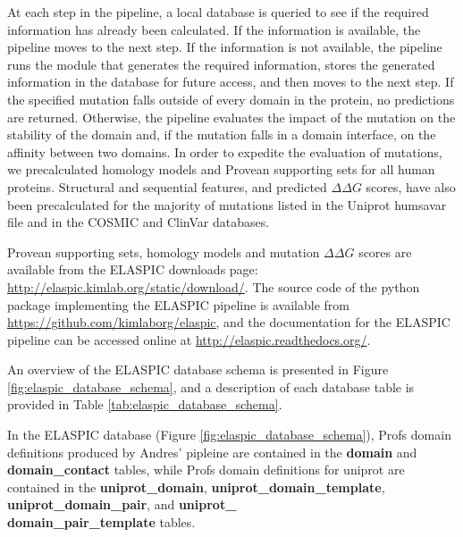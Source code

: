 At each step in the pipeline, a local database is queried to see if the required information has already been calculated. If the information is available, the pipeline moves to the next step. If the information is not available, the pipeline runs the module that generates the required information, stores the generated information in the database for future access, and then moves to the next step. If the specified mutation falls outside of every domain in the protein, no predictions are returned. Otherwise, the pipeline evaluates the impact of the mutation on the stability of the domain and, if the mutation falls in a domain interface, on the affinity between two domains. In order to expedite the evaluation of mutations, we precalculated homology models and Provean supporting sets for all human proteins. Structural and sequential features, and predicted $\Delta \Delta G$ scores, have also been precalculated for the majority of mutations listed in the Uniprot humsavar file \cite{consortium_uniprot:_2015} and in the COSMIC \cite{forbes_cosmic:_2015} and ClinVar \cite{landrum_clinvar:_2016} databases.

Provean supporting sets, homology models and mutation $\Delta \Delta G$ scores are available from the ELASPIC downloads page: \url{http://elaspic.kimlab.org/static/download/}. The source code of the python package implementing the ELASPIC pipeline is available from \url{https://github.com/kimlaborg/elaspic}, and the documentation for the ELASPIC pipeline can be accessed online at \url{http://elaspic.readthedocs.org/}.

An overview of the ELASPIC database schema is presented in Figure \ref{fig:elaspic_database_schema}, and a description of each database table is provided in Table \ref{tab:elaspic_database_schema}.

In the ELASPIC database (Figure \ref{fig:elaspic_database_schema}), Profs domain definitions produced by Andres' pipleine are contained in the \textbf{domain} and \textbf{domain\_contact} tables, while Profs domain definitions for uniprot are contained in the \textbf{uniprot\_domain}, \textbf{uniprot\_domain\_template}, \textbf{uniprot\_domain\_pair}, and \textbf{uniprot\_\\domain\_pair\_template} tables.


